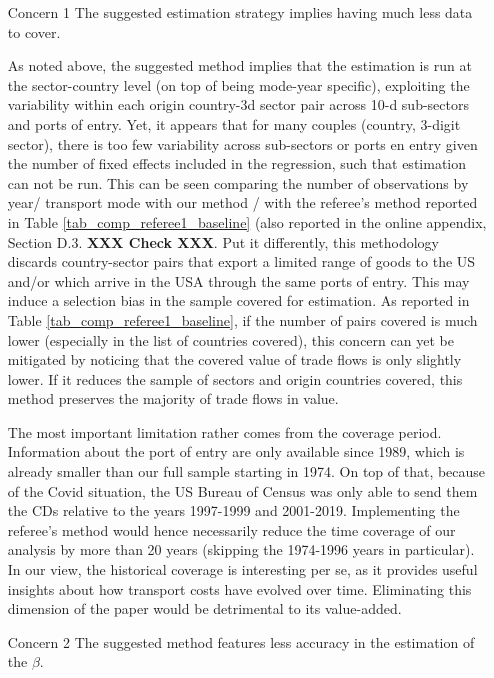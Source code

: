 \documentclass[a4paper,11pt]{article}
\begin{document}
\begin{itemize}
\begin{enumerate}
\begin{table}[htbp]
\begin{itemize}
\item[Concern 1] The suggested estimation strategy implies having much less data to cover.

As noted above, the suggested method implies that the estimation is run at the sector-country level (on top of being mode-year specific), exploiting the variability within each origin country-3d sector pair across 10-d sub-sectors and ports of entry. Yet, it appears that for many couples (country, 3-digit sector), there is too few variability across sub-sectors or ports en entry given the number of fixed effects included in the regression, such that estimation can not be run. This can be seen comparing the number of observations by year/ transport mode with our method / with the referee's method reported in Table \ref{tab_comp_referee1_baseline} (also reported in the online appendix, Section D.3. \textbf{XXX Check XXX}. Put it differently, this methodology discards country-sector pairs that export a limited range of goods to the US and/or which arrive in the USA through the same ports of entry. This may induce a selection bias in the sample covered for estimation. As reported in Table  \ref{tab_comp_referee1_baseline}, if the number of pairs covered is much lower (especially in the list of countries covered), this concern can yet be mitigated by noticing that the covered value of trade flows is only slightly lower. If it reduces the sample of sectors and origin countries covered, this method preserves the majority of trade flows in value.

The most important limitation rather comes from the coverage period. Information about the port of entry are only available since 1989, which is already smaller than our full sample starting in 1974. On top of that, because of the Covid situation, the US Bureau of Census was only able to send them the CDs relative to the years 1997-1999 and 2001-2019. Implementing the referee's method would hence necessarily reduce the time coverage of our analysis by more than 20 years (skipping the 1974-1996 years in particular). In our view, the historical coverage is interesting per se, as it provides useful insights about how transport costs have evolved over time. Eliminating this dimension of the paper would be detrimental to its value-added.


\item[Concern 2] The suggested method features less accuracy in the estimation of the $\beta$.


\end{itemize}
\end{table}
\end{enumerate}
\end{itemize}
\end{document}
